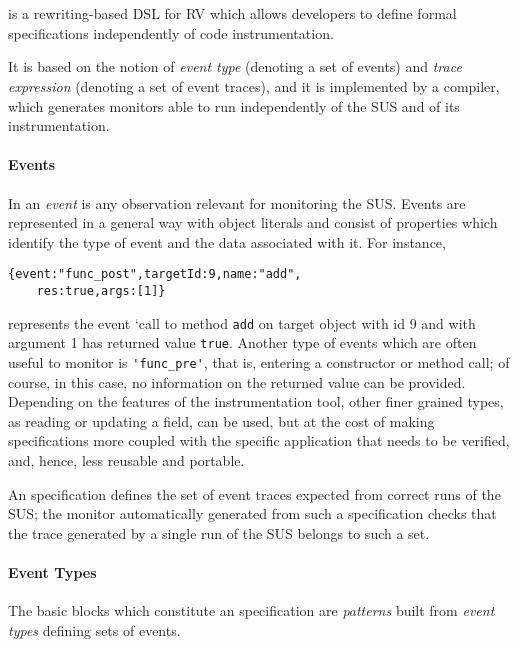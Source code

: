\section{\rml}
\label{sec:rml}
\rml\cite{RML2021} is a rewriting-based DSL for RV which allows developers to define formal specifications independently of code instrumentation.

It  is based on the notion of \emph{event type} (denoting a set of events) and \emph{trace expression} (denoting a set of event traces),
and it is implemented by a compiler, which generates monitors able to run independently of the SUS and of its instrumentation. 

\paragraph{Events}
In \rml an \emph{event} is any observation relevant for monitoring the SUS.
Events are represented in a general way with object literals and
consist of properties which identify the type of event and the data associated with it. For instance,

\begin{lstlisting}
{event:"func_post",targetId:9,name:"add",
    res:true,args:[1]}
\end{lstlisting}          
represents the event
`call to method \lstinline{add} on target object with id 9 and with argument 1  has returned value \lstinline{true}.
Another type of events which are often useful to monitor is \lstinline{'func_pre'}, that is, entering a constructor or method call; of course, in this
case, no information on the returned value can be provided. Depending on the features of the instrumentation tool, other finer grained types,
as reading or updating a field, can be used, but at the cost of making specifications more coupled with the specific application that needs to be
verified, and, hence, less reusable and portable.

An \rml specification defines the set of event traces expected from correct runs of the SUS; the monitor automatically generated from
such a specification checks that the trace generated by a single run of the SUS belongs to such a set.

\paragraph{Event Types}
The basic blocks which constitute an \rml specification are \emph{patterns} built from
\emph{event types} defining sets of events.

